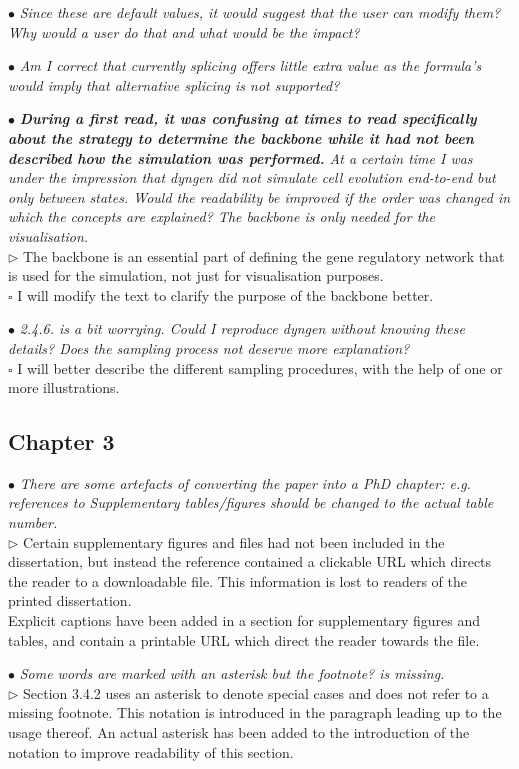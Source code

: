 \documentclass[10pt]{article}
\newcommand{\todo}{$\square$}
\newcommand{\done}{\makebox[0pt][l]{$\square$}\raisebox{.15ex}{\hspace{0.1em}$\checkmark$}}%
\newcommand{\exam}[2][\  ]{\hspace{0pt}\marginpar{\color{myred}#1}$\bullet$ \textit{#2}}
\newcommand{\imp}[1]{\textbf{#1}}
\newcommand{\answ}[1]{{\color{myblue} $\triangleright$ #1}}
\newcommand{\task}[2][\todo]{{\color{myblue} #1 #2}}
\newcommand{\bigexclaim}{\raisebox{-0.1em}{\BigTriangleUp}\hspace{-0.32em}\llap{\small\textbf{!}}\hspace{0.32em}}
\newcommand{\tagimp}{\bigexclaim}
\newcommand{\tagtime}{{\Large $\hourglass$}}
\begin{document}
\exam{Since these are default values, it would suggest
		that the user can modify them? Why would a user do that and what would be
		the impact?}
	
\exam{Am I correct that currently splicing offers little extra value as the formula’s
		would imply that alternative splicing is not supported?}


\exam[\tagimp \tagtime]{\imp{During a first read, it was confusing at times to read specifically about the
	strategy to determine the backbone while it had not been described how the
	simulation was performed.} At a certain time I was under the impression that
	dyngen did not simulate cell evolution end-to-end but only between states.
	Would the readability be improved if the order was changed in which the
	concepts are explained? The backbone is only needed for the visualisation.} \\
\answ{The backbone is an essential part of defining the gene regulatory network that is used for the simulation, not just for visualisation purposes.} \\
\task{I will modify the text to clarify the purpose of the backbone better.}


\exam{2.4.6. is a bit worrying. Could I reproduce dyngen without knowing these
		details? Does the sampling process not deserve more explanation?} \\
\task{I will better describe the different sampling procedures, with the help of one or more illustrations.}	



\subsection{Chapter 3}

\exam{There are some artefacts of converting the paper into a PhD chapter: e.g.
	references to Supplementary tables/figures should be changed to the actual
	table number.} \\
\answ{Certain supplementary figures and files had not been included in the dissertation, but instead the reference contained a clickable URL which directs the reader to a downloadable file. This information is lost to readers of the printed dissertation.} \\ \task[\done]{Explicit captions have been added in a section for supplementary figures and tables, and contain a printable URL which direct the reader towards the file.}

\exam{Some words are marked with an asterisk but the footnote? is
	missing.} \\
\answ{Section 3.4.2 uses an asterisk to denote special cases and does not refer to a missing footnote. This notation is introduced in the paragraph leading up to the usage thereof. An actual asterisk has been added to the introduction of the notation to improve readability of this section.}
\end{document}
